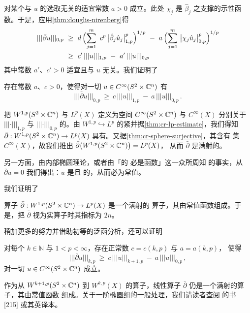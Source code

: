 对某个与 $u$ 的选取无关的适宜常数 $a>0$ 成立。此处 $\chi_{j}$ 是 $\hat{\beta}_{j}$ %
之支撑的示性函数。于是，应用\cref{thm:douglis-nirenberg}得
\begin{align*}
\vert\vert\vert\bar{\partial}u\vert\vert\vert_{0,p}\ &\geq\ d\,\Bigl(\sum_{j=1}^{m}\ c^{p}\,\bigl|\hat{\beta}_{j}\hat{u}_{j}\bigr|_{1,p}^{p}\Bigr)^{1/p}\ -\ a\,\Bigl(\sum_{j=1}^{m}\ \bigl|\chi_{j}\hat{u}_{j}\bigr|_{0,p}^{p}\Bigr)^{1/p}\\
&\geq\ c'\,\vert\vert\vert u\vert\vert\vert_{1,p}\ -\ a'\,\vert\vert\vert u\vert\vert\vert_{0,p}
\end{align*}
其中常数 $a'$、$c'>0$ 适宜且与 $u$ 无关。我们证明了

\begin{theorem}\label{thm:cr-lp-estimate}
存在常数 $a$、$c>0$，使得对一切 $u\in C^{\infty}(S^{2}\times\mathbb{C}^{n})$ 有
\[
\vert\vert\vert\bar{\partial}u\vert\vert\vert_{0,p}\ \geq\ c\,\vert\vert\vert u\vert\vert\vert_{1,p}\ -\ a\,\vert\vert\vert u\vert\vert\vert_{0,p}\,.
\]
\end{theorem}

把 $W^{1,p}(S^{2}\times\mathbb{C}^{n})$ 与 $L^{p}(X)$ 定义为空间 $C^{\infty}(S^{2}\times\mathbb{C}^{n})$ %
与 $C^{\infty}(X)$ 分别关于\trNorm{} $\vert\vert\vert\cdot\vert\vert\vert_{1,p}$ 与%
 $\vert\vert\vert\cdot\vert\vert\vert_{0,p}$ 的\trCompletion。由 $W^{1,p}\hookrightarrow L^{p}$ %
的紧\trEmbedding{}并据\cref{thm:cr-lp-estimate}，我们得知 $\bar{\partial}:W^{1,p}(S^{2}\times\mathbb{C}^{n})\to L^{p}(X)$ %
具有\trClosed\trRange。又据\cref{thm:cr-sphere-surjective}，其\trRange{}含有%
\trDense{}集 $C^{\infty}(X)$，故我们推出 $\bar{\partial}\bigl(W^{1,p}(S^{2}\times\mathbb{C}^{n})\bigr)=L^{p}(X)$，%
从而 $\bar{\partial}$ 是满射的。

另一方面，由内部椭圆\trRegularity{}理论，或者由「\trHolomorphic{}的%
\trDistribution{}必是\trHolomorphic{}函数」这一众所周知%
的事实，从 $\bar{\partial}u=0$ 我们得出：$u$ 是\trHolomorphic{}且\trBounded{} %
的，从而必为常值。

我们证明了

\begin{theorem}\label{thm:cr-fredholm-w1p}
算子 $\bar{\partial}:W^{1,p}(S^{2}\times\mathbb{C}^{n})\to L^{p}(X)$ 是一个满射的%
\trFredholm{}算子，其\trKernel{}由常值函数组成。于是，把 $\bar{\partial}$ %
视为实算子时其指标为 $2n$。
\end{theorem}

稍加更多的努力并借助初等的泛函分析，还可以证明

\begin{theorem}\label{thm:cr-higher-estimate}
对每个 $k\in\mathbb{N}$ 与 $1<p<\infty$，存在正常数 $c=c(k,p)$ 与 $a=a(k,p)$，%
使得
\[
\vert\vert\vert\bar{\partial}u\vert\vert\vert_{k,p}\ \geq\ c\,\vert\vert\vert u\vert\vert\vert_{k+1,p}\ -\ a\,\vert\vert\vert u\vert\vert\vert_{0,p}\,,
\]
对一切 $u\in C^{\infty}(S^{2}\times\mathbb{C}^{n})$ 成立。
\end{theorem}

作为从 $W^{k+1,p}(S^{2}\times\mathbb{C}^{n})$ 到 $W^{k,p}(X)$ 的算子，线性算子%
 $\bar{\partial}$ 仍是一个满射的\trFredholm{}算子，其\trKernel{}由常值函数%
组成。关于一阶椭圆\trDifferentialEquation{}组的一般处理，我们请读者查阅%
\trVekua{}的书 [215] 或其英译本。
